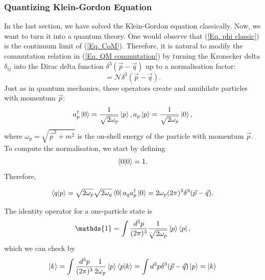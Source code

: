 \documentclass[11pt]{article}
\theoremstyle{definition}
\begin{document}
\subsubsection{Quantizing Klein-Gordon Equation}
In the last section, we have solved the Klein-Gordon equation classically. Now, we want to turn it into a quantum theory. One would observe that (\ref{Eq. phi classic}) is the continuum limit of (\ref{Eq. CoM}). Therefore, it is natural to modify the commutation relation in (\ref{Eq. QM commutation}) by turning the Kronecker delta $\delta_{ij}$ into the Dirac delta function $\delta^3(\vec{p}-\vec{q})$ up to a normalisation factor:
\begin{equation}
    [a_p, a_p^\dagger] = \mathcal{N}\delta^3(\vec{p}-\vec{q}).
\end{equation}
Just as in quantum mechanics, these operators create and annihilate particles with momentum $\vec{p}$:
\begin{equation}
    a_p^\dagger \ket{0} = \frac{1}{\sqrt{2\omega_p}}\ket{p}, a_p\ket{p} = \frac{1}{\sqrt{2\omega_p}}\ket{0},
\end{equation}
where $\omega_p = \sqrt{\vec{p}^2 + m^2}$ is the on-shell energy of the particle with momentum $\vec{p}$.
To compute the normalisation, we start by defining 
\begin{equation}
    \braket{0}{0} =  1.
\end{equation}
Therefore, 
\begin{shaded}
\begin{equation}
    \braket{q}{p} = \sqrt{2\omega_p}\sqrt{2\omega_q}\bra{0}a_q a_p^\dagger\ket{0} = 2\omega_p (2\pi)^3\delta^3(\vec{p}-\vec{q}).
\end{equation}
\end{shaded}
The identity operator for a one-particle state is 
\begin{equation}
    \mathds{1} = \int \frac{d^3p}{(2\pi)^3} \frac{1}{\sqrt{2\omega_p}}\ket{p}\bra{p},
\end{equation}
which we can check by 
\begin{equation}
    \ket{k} = \int \frac{d^3p}{(2\pi)^3} \frac{1}{2\omega_p}\ket{p}\braket{p}{k} = \int d^3p   \delta^3(\vec{p}-\vec{q})\ket{p} = \ket{k}
\end{equation}
\end{document}
